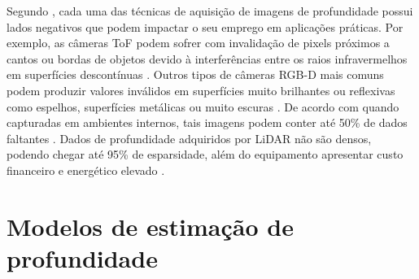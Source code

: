Segundo \cite{castellano2023performance}, cada uma das técnicas de aquisição de imagens de profundidade possui lados negativos que podem impactar o seu emprego em aplicações práticas. Por exemplo, as câmeras ToF podem sofrer com invalidação de pixels próximos a cantos ou bordas de objetos devido à interferências entre os raios infravermelhos em superfícies descontínuas \cite{hansard2012time}. Outros tipos de câmeras RGB-D mais comuns podem produzir valores inválidos em superfícies muito brilhantes ou reflexivas como espelhos, superfícies metálicas ou muito escuras \cite{zollhofer2019commodity}. De acordo com  quando capturadas em ambientes internos, tais imagens podem conter até 50\% de dados faltantes \cite{zhang2018deep}. Dados de profundidade adquiridos por LiDAR não são densos, podendo chegar até 95\% de esparsidade, além do equipamento apresentar custo financeiro e energético elevado \cite{khan2020deep} \cite{hu2022deep}. 






\section{Modelos de estimação de profundidade}


